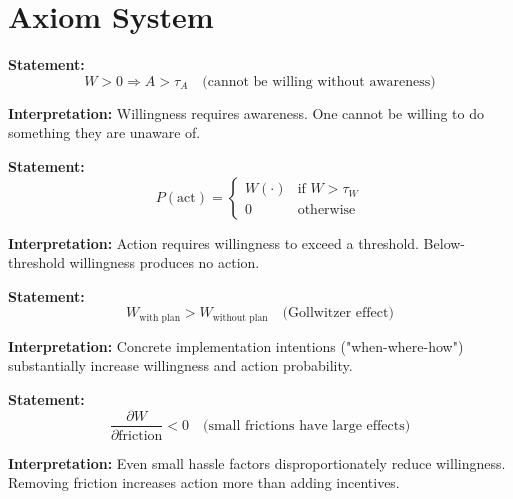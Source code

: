 \section{Axiom System}
\label{sec:ready-axioms}

\begin{tcolorbox}[colback=gray!5!white, colframe=gray!75!black,
    title=Axiom WIL-1: Awareness Prerequisite]
\textbf{Statement:}
\begin{equation}
W > 0 \Rightarrow A > \tau_A \quad \text{(cannot be willing without awareness)}
\end{equation}

\textbf{Interpretation:} Willingness requires awareness. One cannot be willing
to do something they are unaware of.
\end{tcolorbox}

\begin{tcolorbox}[colback=gray!5!white, colframe=gray!75!black,
    title=Axiom WIL-2: Threshold Effects]
\textbf{Statement:}
\begin{equation}
P(\text{act}) = \begin{cases}
W(\cdot) & \text{if } W > \tau_W \\
0 & \text{otherwise}
\end{cases}
\end{equation}

\textbf{Interpretation:} Action requires willingness to exceed a threshold.
Below-threshold willingness produces no action.
\end{tcolorbox}

\begin{tcolorbox}[colback=gray!5!white, colframe=gray!75!black,
    title=Axiom WIL-3: Implementation Intention Effect]
\textbf{Statement:}
\begin{equation}
W_{\text{with plan}} > W_{\text{without plan}} \quad \text{(Gollwitzer effect)}
\end{equation}

\textbf{Interpretation:} Concrete implementation intentions ("when-where-how")
substantially increase willingness and action probability.
\end{tcolorbox}

\begin{tcolorbox}[colback=gray!5!white, colframe=gray!75!black,
    title=Axiom WIL-4: Friction Sensitivity]
\textbf{Statement:}
\begin{equation}
\frac{\partial W}{\partial \text{friction}} < 0 \quad \text{(small frictions have large effects)}
\end{equation}

\textbf{Interpretation:} Even small hassle factors disproportionately reduce willingness.
Removing friction increases action more than adding incentives.
\end{tcolorbox}

